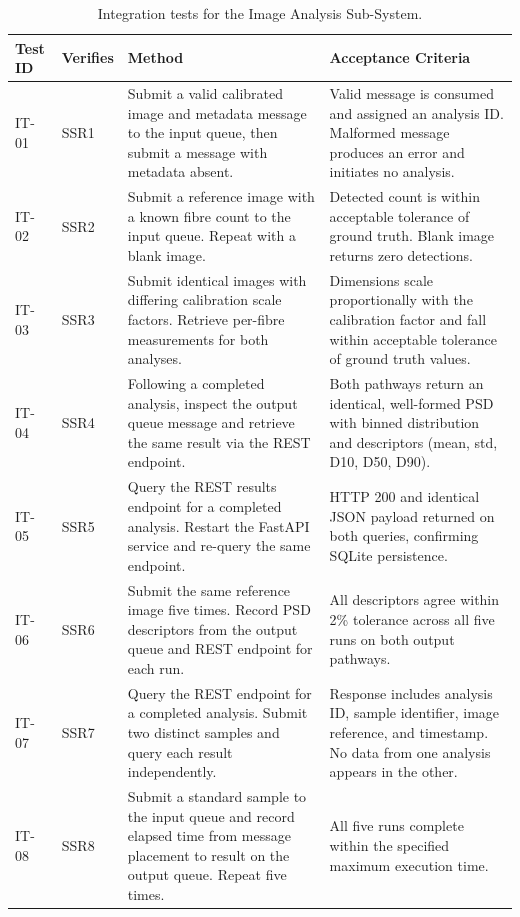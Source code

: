 \documentclass[11pt,a4paper]{article}
\begin{document}
\begin{table}[H]
\centering
\renewcommand{\arraystretch}{1.2}
\begin{tabular}{@{}p{2cm}p{2cm}p{6cm}p{5cm}@{}}
\toprule
\textbf{Test ID} & \textbf{Verifies} & \textbf{Method} & \textbf{Acceptance Criteria} \\
\midrule
IT-01 & SSR1 & Submit a valid calibrated image and metadata message to the input queue, then submit a message with metadata absent. & Valid message is consumed and assigned an analysis ID. Malformed message produces an error and initiates no analysis. \\ \midrule
IT-02 & SSR2 & Submit a reference image with a known fibre count to the input queue. Repeat with a blank image. & Detected count is within acceptable tolerance of ground truth. Blank image returns zero detections. \\ \midrule
IT-03 & SSR3 & Submit identical images with differing calibration scale factors. Retrieve per-fibre measurements for both analyses. & Dimensions scale proportionally with the calibration factor and fall within acceptable tolerance of ground truth values. \\ \midrule
IT-04 & SSR4 & Following a completed analysis, inspect the output queue message and retrieve the same result via the REST endpoint. & Both pathways return an identical, well-formed PSD with binned distribution and descriptors (mean, std, D10, D50, D90). \\ \midrule
IT-05 & SSR5 & Query the REST results endpoint for a completed analysis. Restart the FastAPI service and re-query the same endpoint. & HTTP 200 and identical JSON payload returned on both queries, confirming SQLite persistence. \\ \midrule
IT-06 & SSR6 & Submit the same reference image five times. Record PSD descriptors from the output queue and REST endpoint for each run. & All descriptors agree within 2\% tolerance across all five runs on both output pathways. \\ \midrule
IT-07 & SSR7 & Query the REST endpoint for a completed analysis. Submit two distinct samples and query each result independently. & Response includes analysis ID, sample identifier, image reference, and timestamp. No data from one analysis appears in the other. \\ \midrule
IT-08 & SSR8 & Submit a standard sample to the input queue and record elapsed time from message placement to result on the output queue. Repeat five times. & All five runs complete within the specified maximum execution time. \\
\bottomrule
\end{tabular}
\caption{Integration tests for the Image Analysis Sub-System.}
\label{tab:integration_tests}
\end{table}
\end{document}
